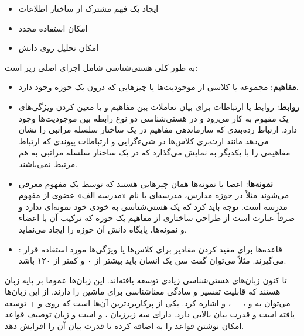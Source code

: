 \begin{itemize}
\item ایجاد یک فهم مشترک از ساختار اطلاعات
\item امکان استفاده مجدد
\item امکان تحلیل روی دانش
\end{itemize}

به طور کلی هستی‌شناسی شامل اجزای اصلی زیر است:

\begin{itemize}
\item \textbf{مفاهیم}: مجموعه‌ یا کلاسی از موجودیت‌ها یا چیزهایی که درون یک حوزه وجود دارد.
\item \textbf{روابط}: روابط یا ارتباطات برای بیان تعاملات بین مفاهیم و یا معین کردن ویژگی‌‌های یک مفهوم به کار می‌‌رود و در هستی‌شناسی دو نوع رابطه بین موجودیت‌ها وجود دارد. ارتباط رده‌بندی که سازماندهی مفاهیم در یک ساختار سلسله مراتبی را نشان می‌‌دهد مانند ارث‌بری کلاس‌ها در شیءگرایی و ارتباطات پیوندی که ارتباط مفاهیمی را با یکدیگر به نمایش می‌‌گذارد که در یک ساختار سلسله مراتبی به هم مرتبط نمی‌‌باشند.
\item \textbf{نمونه‌ها}: اعضا یا نمونه‌ها همان چیزهایی هستند که توسط یک مفهوم معرفی می‌شوند مثلاً در حوزه مدارس، مدرسه‌‌ای با نام «مدرسه الف» عضوی از مفهوم مدرسه است. توجه باید کرد که یک هستی‌شناسی به خودی خود نمونه‌ای ندارد و صرفاً عبارت است از طراحی ساختاری از مفاهیم یک حوزه که ترکیب آن با اعضاء و نمونه‌ها، پایگاه دانش آن حوزه را ایجاد می‌‌نماید.
\item \textbf{}: قاعده‌‌ها برای مقید کردن مقادیر برای کلاس‌ها یا ویژگی‌‌ها مورد استفاده قرار می‌‌گیرند. مثلاً می‌توان گفت سن یک انسان باید بیشتر از ۰ و کمتر از ۱۲۰ باشد.
\end{itemize}

تا کنون زبان‌های هستی‌شناسی زیادی توسعه یافته‌اند. این زبان‌ها عموما بر پایه زبان  \cite{x233} هستند که قابلیت تفسیر و سادگی معناشناسی برای ماشین را دارند. از این زبان‌ها می‌توان به  و  \cite{x234}،  +  \cite{x235}،  \cite{x236} و  \cite{x236Z} اشاره کرد. یکی از پرکاربردترین آن‌ها  است که روی  و  +  توسعه یافته است و قدرت بیان بالایی دارد.  دارای سه زیرزبان  ، و  است و زبان توصیف قواعد  \cite{x237} امکان نوشتن قواعد را به  اضافه کرده تا قدرت بیان آن را افزایش دهد.

